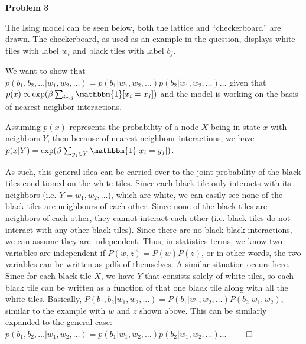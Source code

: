 \textbf{Problem 3}

The Ising model can be seen below, both the lattice and ``checkerboard'' are drawn. The checkerboard, as used as an example in the question, displays white tiles with label $w_i$ and black tiles with label $b_j$.

We want to show that $p(b_1, b_2, \dots \vert w_1, w_2, \dots) = p(b_1 \vert w_1, w_2, \dots)p(b_2 \vert w_1, w_2, \dots)\dots$ given that $p(x) \propto \exp(\beta\sum_{i\sim j} \mathbbm{1}[x_i = x_j])$ and the model is working on the basis of nearest-neighbor interactions.

Assuming $p(x)$ represents the probability of a node $X$ being in state $x$ with neighbors $Y$, then because of nearest-neighbour interactions, we have $p(x \vert Y) = \exp(\beta \sum_{y_j \in Y} \mathbbm{1}[x_i = y_j])$. 

As such, this general idea can be carried over to the joint probability of the black tiles conditioned on the white tiles. Since each black tile only interacts with its neighbors (i.e. $Y = {w_1, w_2, \dots}$), which are white, we can easily see none of the black tiles are neighbours of each other. Since none of the black tiles are neighbors of each other, they cannot interact each other (i.e. black tiles do not interact with any other black tiles). Since there are no black-black interactions, we can assume they are independent. Thus, in statistics terms, we know two variables are independent if $P(w, z) = P(w)P(z)$, or in other words, the two variables can be written as pdfs of themselves. A similar situation occurs here. Since for each black tile $X$, we have $Y$ that consists solely of white tiles, so each black tile can be written as a function of that one black tile along with all the white tiles. Basically, $P(b_1, b_2 \vert w_1, w_2, \dots) = P(b_1 \vert w_1, w_2, \dots)P(b_2 \vert w_1, w_2)$, similar to the example with $w$ and $z$ shown above. This can be similarly expanded to the general case: $p(b_1, b_2, \dots \vert w_1, w_2, \dots) = p(b_1 \vert w_1, w_2, \dots)p(b_2 \vert w_1, w_2, \dots)\dots$ $\qed$

